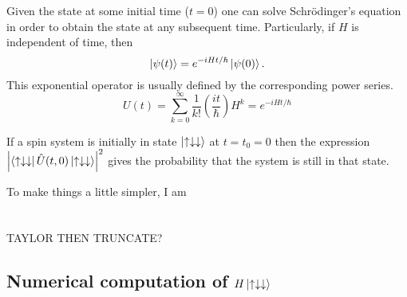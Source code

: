 \documentclass{article}
\begin{document}
Given the state at some initial time ($t=0$) one can solve Schrödinger's equation in order to obtain the state at any subsequent time. Particularly, if $H$ is independent of time, then
\begin{equation}
\ket{\psi(t)}=e^{-iHt/\hbar}\ket{\psi(0)}.
\end{equation}
This exponential operator is usually defined by the corresponding power series. 
\begin{equation}
U(t) = \sum_{k=0}^{\infty}\frac{1}{k!}\left(\frac{it}{\hbar} \right)H^k = e^{-iHt/\hbar}
\end{equation}

If a spin system is initially in state $\ket{\uparrow\downarrow\downarrow}$ at $t=t_0=0$ then the expression $\abs{\bra{\uparrow\downarrow\downarrow}\hat{U}(t,0) \ket{\uparrow\downarrow\downarrow}}^2$ gives the probability that the system is still in that state.

To make things a little simpler, I am 

\section{}
TAYLOR THEN TRUNCATE?

\pagebreak
\begin{appendix}
\section{Numerical computation of $H\ket{\uparrow\downarrow\downarrow}$}
\label{app:updndn}


\end{appendix}
\end{document}
